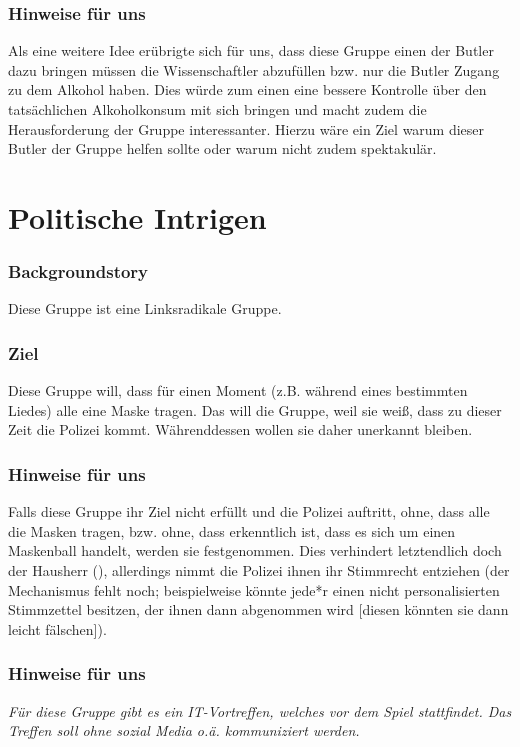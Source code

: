 \documentclass[12pt, a4paper, openany]{report}
\begin{document}
\subsubsection {Hinweise für uns }
Als eine weitere Idee erübrigte sich für uns, dass diese Gruppe einen der Butler dazu bringen müssen die Wissenschaftler abzufüllen bzw. nur die Butler Zugang zu dem Alkohol haben. Dies würde zum einen eine bessere Kontrolle über den tatsächlichen Alkoholkonsum mit sich bringen und macht zudem die Herausforderung der Gruppe interessanter. Hierzu wäre ein Ziel warum dieser Butler der Gruppe helfen sollte oder warum nicht zudem spektakulär. 
\section{Politische Intrigen}
\subsubsection{Backgroundstory}
Diese Gruppe ist eine Linksradikale Gruppe.
\subsubsection{Ziel}
Diese Gruppe will, dass für einen Moment (z.B. während eines bestimmten Liedes) alle eine Maske tragen. 
Das will die Gruppe, weil sie weiß, dass zu dieser Zeit die Polizei kommt.
Währenddessen wollen sie daher unerkannt bleiben.

\subsubsection{Hinweise für uns}
Falls diese Gruppe ihr Ziel nicht erfüllt und die Polizei auftritt, ohne, dass alle die Masken tragen, bzw. ohne, dass erkenntlich ist, dass es sich um einen Maskenball handelt, werden sie festgenommen.
Dies verhindert letztendlich doch der Hausherr (), allerdings nimmt die Polizei ihnen ihr Stimmrecht entziehen (der Mechanismus fehlt noch; beispielweise könnte jede*r einen nicht personalisierten Stimmzettel besitzen, der ihnen dann abgenommen wird [diesen könnten sie dann leicht fälschen]). 

\subsubsection{Hinweise für uns}
\emph{Für diese Gruppe gibt es ein IT-Vortreffen, welches vor dem Spiel stattfindet.
Das Treffen soll ohne sozial Media o.ä. kommuniziert werden.}
\end{document}
